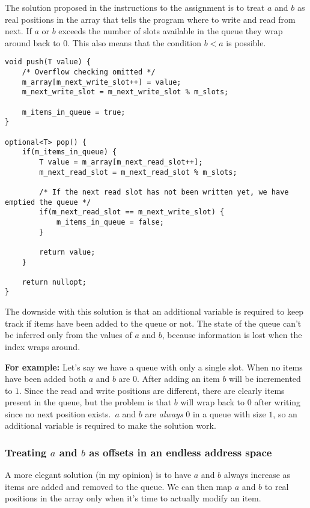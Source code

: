 \documentclass[a4paper,11pt]{article}
\begin{document}
The solution proposed in the instructions to the assignment is to treat $a$ and $b$ as real positions in the array that tells the program where to write and read from next.
If $a$ or $b$ exceeds the number of slots available in the queue they wrap around back to $0$. This also means that the condition $b < a$ is possible.

\begin{verbatim}
void push(T value) {
	/* Overflow checking omitted */
	m_array[m_next_write_slot++] = value;
	m_next_write_slot = m_next_write_slot % m_slots;

	m_items_in_queue = true;
}

optional<T> pop() {
	if(m_items_in_queue) {
		T value = m_array[m_next_read_slot++];
		m_next_read_slot = m_next_read_slot % m_slots;

		/* If the next read slot has not been written yet, we have emptied the queue */
		if(m_next_read_slot == m_next_write_slot) {
			m_items_in_queue = false;
		}

		return value;
	}

	return nullopt;
}
\end{verbatim}

The downside with this solution is that an additional variable is required to keep track if items have been added to the queue or not.
The state of the queue can't be inferred only from the values of $a$ and $b$, because information is lost when the index wraps around.

\textbf{For example:} Let's say we have a queue with only a single slot. When no items have been added both $a$ and $b$ are $0$. After adding an item $b$ will be incremented to $1$.
Since the read and write positions are different, there are clearly items present in the queue, but the problem is that $b$ will wrap back to $0$ after writing since no next position exists.\
$a$ and $b$ are \emph{always} $0$ in a queue with size $1$, so an additional variable is required to make the solution work.

\subsubsection*{Treating $a$ and $b$ as offsets in an endless address space}

A more elegant solution (in my opinion) is to have $a$ and $b$ always increase as items are added and removed to the queue. We can then map $a$ and $b$ to real positions in the array only when it's time to actually modify an item.
\end{document}
